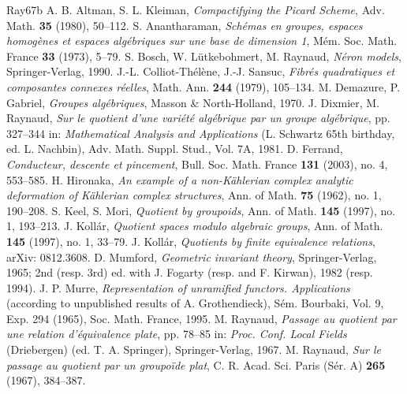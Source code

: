 \begin{thebibliography}{Ray67b}
 A. B. Altman, S. L. Kleiman, \emph{Compactifying the Picard Scheme}, Adv. Math. \textbf{35} (1980), 50--112.
 S. Anantharaman, \emph{Schémas en groupes, espaces homogènes et espaces algébriques sur une base de dimension 1}, Mém. Soc. Math. France \textbf{33} (1973), 5--79.
 S. Bosch, W. Lütkebohmert, M. Raynaud, \emph{Néron models}, Springer-Verlag, 1990.
 J.-L. Colliot-Thélène, J.-J. Sansuc, \emph{Fibrés quadratiques et composantes connexes réelles}, Math. Ann. \textbf{244} (1979), 105--134.
 M. Demazure, P. Gabriel, \emph{Groupes algébriques}, Masson \& North-Holland, 1970.
 J. Dixmier, M. Raynaud, \emph{Sur le quotient d'une variété algébrique par un groupe algébrique}, pp. 327--344 in: \emph{Mathematical Analysis and Applications} (L. Schwartz 65th birthday, ed. L. Nachbin), Adv. Math. Suppl. Stud., Vol. 7A, 1981.
 D. Ferrand, \emph{Conducteur, descente et pincement}, Bull. Soc. Math. France \textbf{131} (2003), no. 4, 553--585.
 H. Hironaka, \emph{An example of a non-Kählerian complex analytic deformation of Kählerian complex structures}, Ann. of Math. \textbf{75} (1962), no. 1, 190--208.
 S. Keel, S. Mori, \emph{Quotient by groupoids}, Ann. of Math. \textbf{145} (1997), no. 1, 193--213.
 J. Kollár, \emph{Quotient spaces modulo algebraic groups}, Ann. of Math. \textbf{145} (1997), no. 1, 33--79.
 J. Kollár, \emph{Quotients by finite equivalence relations}, arXiv: 0812.3608.
 D. Mumford, \emph{Geometric invariant theory}, Springer-Verlag, 1965; 2nd (resp. 3rd) ed. with J. Fogarty (resp. and F. Kirwan), 1982 (resp. 1994).
 J. P. Murre, \emph{Representation of unramified functors. Applications} (according to unpublished results of A. Grothendieck), Sém. Bourbaki, Vol. 9, Exp. 294 (1965), Soc. Math. France, 1995.
 M. Raynaud, \emph{Passage au quotient par une relation d'équivalence plate}, pp. 78--85 in: \emph{Proc. Conf. Local Fields} (Driebergen) (ed. T. A. Springer), Springer-Verlag, 1967.
 M. Raynaud, \emph{Sur le passage au quotient par un groupoïde plat}, C. R. Acad. Sci. Paris (Sér. A) \textbf{265} (1967), 384--387.
\end{thebibliography}
